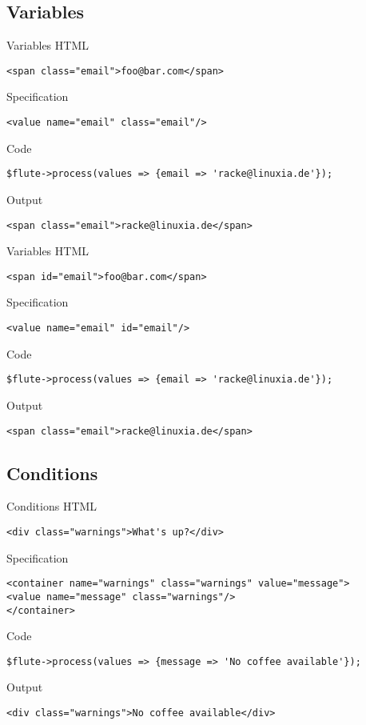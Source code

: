 \subsection{Variables}
\begin{frame}[fragile]{Variables}
HTML
\begin{lstlisting}
<span class="email">foo@bar.com</span>
\end{lstlisting}
Specification
\begin{lstlisting}
<value name="email" class="email"/>
\end{lstlisting}
Code
\begin{lstlisting}
$flute->process(values => {email => 'racke@linuxia.de'});
\end{lstlisting}
Output
\begin{lstlisting}
<span class="email">racke@linuxia.de</span>
\end{lstlisting}
\end{frame}

\begin{frame}[fragile]{Variables}
HTML
\begin{lstlisting}
<span id="email">foo@bar.com</span>
\end{lstlisting}
Specification
\begin{lstlisting}
<value name="email" id="email"/>
\end{lstlisting}
Code
\begin{lstlisting}
$flute->process(values => {email => 'racke@linuxia.de'});
\end{lstlisting}
Output
\begin{lstlisting}
<span class="email">racke@linuxia.de</span>
\end{lstlisting}
\end{frame}

\subsection{Conditions}
\begin{frame}[fragile]{Conditions}
HTML
\begin{lstlisting}
<div class="warnings">What's up?</div>
\end{lstlisting}
Specification
\begin{lstlisting}
<container name="warnings" class="warnings" value="message">
<value name="message" class="warnings"/>
</container>
\end{lstlisting}
Code
\begin{lstlisting}
$flute->process(values => {message => 'No coffee available'});
\end{lstlisting}
Output
\begin{lstlisting}
<div class="warnings">No coffee available</div>
\end{lstlisting}
\end{frame}

